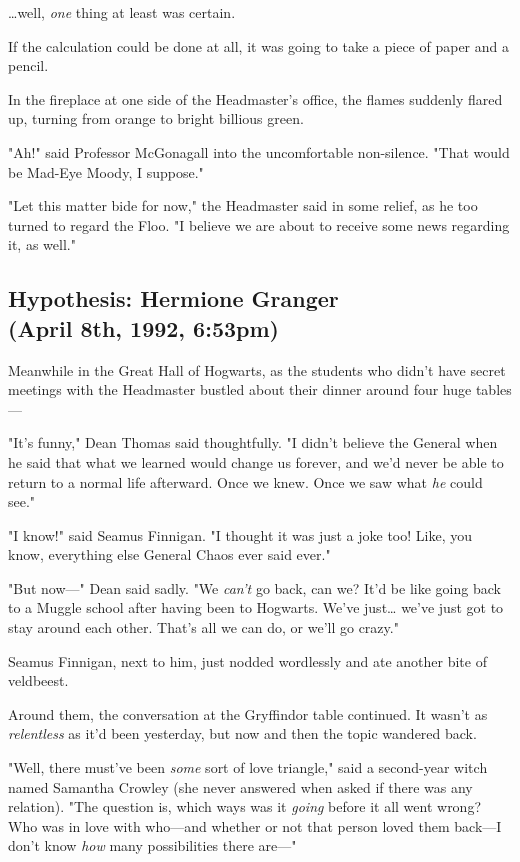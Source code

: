 {\ldots}well, \emph{one} thing at least was certain.

If the calculation could be done at all, it was going to take a piece of paper 
and a pencil.

In the fireplace at one side of the Headmaster's office, the flames suddenly 
flared up, turning from orange to bright billious green.

"Ah!" said Professor McGonagall into the uncomfortable non-silence. "That would 
be Mad-Eye Moody, I suppose."

"Let this matter bide for now," the Headmaster said in some relief, as he too 
turned to regard the Floo. "I believe we are about to receive some news 
regarding it, as well."
\sbreak
\vspace{-2\baselineskip}
\subsection{Hypothesis: Hermione Granger\\
(April 8th, 1992, 6:53pm)}

Meanwhile in the Great Hall of Hogwarts, as the students who didn't have secret 
meetings with the Headmaster bustled about their dinner around four huge 
tables---

"It's funny," Dean Thomas said thoughtfully. "I didn't believe the General when 
he said that what we learned would change us forever, and we'd never be able to 
return to a normal life afterward. Once we knew. Once we saw what \emph{he} 
could see."

"I know!" said Seamus Finnigan. "I thought it was just a joke too! Like, you 
know, everything else General Chaos ever said ever."

"But now---" Dean said sadly. "We \emph{can't} go back, can we? It'd be like 
going back to a Muggle school after having been to Hogwarts. We've just{\ldots} 
we've just got to stay around each other. That's all we can do, or we'll go 
crazy."

Seamus Finnigan, next to him, just nodded wordlessly and ate another bite of 
veldbeest.

Around them, the conversation at the Gryffindor table continued. It wasn't as 
\emph{relentless} as it'd been yesterday, but now and then the topic wandered 
back.

"Well, there must've been \emph{some} sort of love triangle," said a 
second-year witch named Samantha Crowley (she never answered when asked if 
there was any relation). "The question is, which ways was it \emph{going} 
before it all went wrong? Who was in love with who---and whether or not that 
person loved them back---I don't know \emph{how} many possibilities there 
are---"

